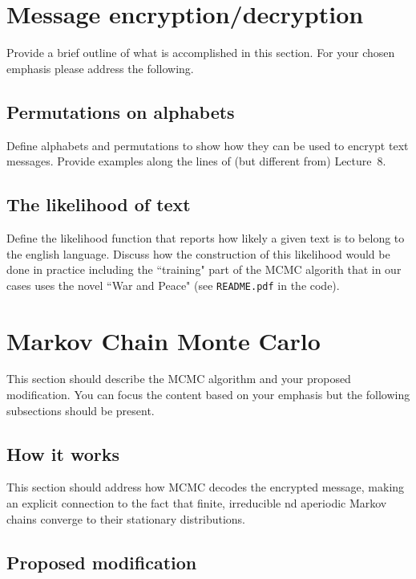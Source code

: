 \documentclass{article}
\begin{document}
\section{Message encryption/decryption}

Provide a brief outline of what is accomplished in this section.
For your chosen emphasis please address the following.


\subsection{Permutations on alphabets}

Define alphabets and permutations to show how they can be 
used to encrypt text messages. Provide  examples
along the lines of (but different from) Lecture~8.


\subsection{The likelihood of text}

Define the likelihood function that reports how likely a given
text is to belong to the english language. Discuss how the
construction of this likelihood would be done in practice
including the ``training" part of the MCMC algorith that
in our cases uses the novel ``War and Peace" 
(see \verb|README.pdf| in the code).

\section{Markov Chain Monte Carlo}

This section should describe the MCMC algorithm and your
proposed modification. You can focus the content
based on your emphasis but the following subsections
should be present.

\subsection{How it works}

This section should address how MCMC decodes the encrypted
message, making an explicit connection to 
the fact that finite, irreducible
nd aperiodic Markov chains converge to their stationary 
distributions.

\subsection{Proposed modification}
\end{document}
